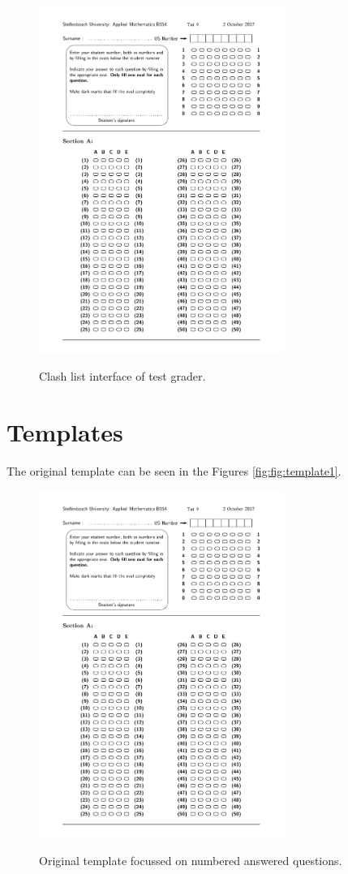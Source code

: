 \begin{figure}
  \centering
  \includegraphics[width=8cm]{clashInterface}\\
  \caption{Clash list interface of test grader.}
  \label{fig:clashInterface}
\end{figure}

\section{Templates}

The original template can be seen in the Figures \ref{fig:fig:template1}. 

\begin{figure}
  \centering
  \includegraphics[width=8cm]{template1}\\
  \caption{Original template focussed on numbered answered questions.}
  \label{fig:template1}
\end{figure}


